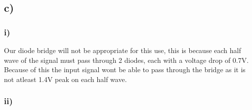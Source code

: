 \documentclass[a4paper,11pt]{article}
\begin{document}
\subsection*{c)}

\subsubsection*{i)}

Our diode bridge will not be appropriate for this use, this is because each half wave of the signal must pass through 2 diodes, each with a voltage drop of 0.7V. Because of this the input signal wont be able to pass through the bridge as it is not atleast 1.4V peak on each half wave.

\subsubsection*{ii)}
\end{document}
